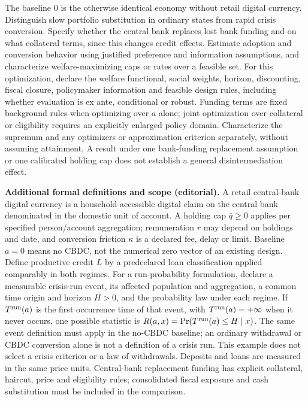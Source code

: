 \documentclass[11pt,a4paper]{article}
\begin{document}
The baseline \(0\) is the otherwise identical economy without retail digital currency. Distinguish slow portfolio substitution in ordinary states from rapid crisis conversion. Specify whether the central bank replaces lost bank funding and on what collateral terms, since this changes credit effects. Estimate adoption and conversion behavior using justified preference and information assumptions, and characterize welfare-maximizing caps or rates over a feasible set. For this optimization, declare the welfare functional, social weights, horizon, discounting, fiscal closure, policymaker information and feasible design rules, including whether evaluation is ex ante, conditional or robust. Funding terms are fixed background rules when optimizing over \(a\) alone; joint optimization over collateral or eligibility requires an explicitly enlarged policy domain. Characterize the supremum and any optimizers or approximation criterion separately, without assuming attainment. A result under one bank-funding replacement assumption or one calibrated holding cap does not establish a general disintermediation effect.

\textbf{Additional formal definitions and scope (editorial).} A retail central-bank digital currency is a household-accessible digital claim on the central bank denominated in the domestic unit of account. A holding cap \(\bar q\geq0\) applies per specified person/account aggregation; remuneration \(r\) may depend on holdings and date, and conversion friction \(\kappa\) is a declared fee, delay or limit. Baseline \(a=0\) means no CBDC, not the numerical zero vector of an existing design. Define productive credit \(L\) by a predeclared loan classification applied comparably in both regimes. For a run-probability formulation, declare a measurable crisis-run event, its affected population and aggregation, a common time origin and horizon \(H>0\), and the probability law under each regime. If \(T^{\rm run}(a)\) is the first occurrence time of that event, with \(T^{\rm run}(a)=+\infty\) when it never occurs, one possible statistic is \(R(a,x)=\Pr(T^{\rm run}(a)\leq H\mid x)\). The same event definition must apply in the no-CBDC baseline; an ordinary withdrawal or CBDC conversion alone is not a definition of a crisis run. This example does not select a crisis criterion or a law of withdrawals. Deposits and loans are measured in the same price units. Central-bank replacement funding has explicit collateral, haircut, price and eligibility rules; consolidated fiscal exposure and cash substitution must be included in the comparison.
\end{document}
